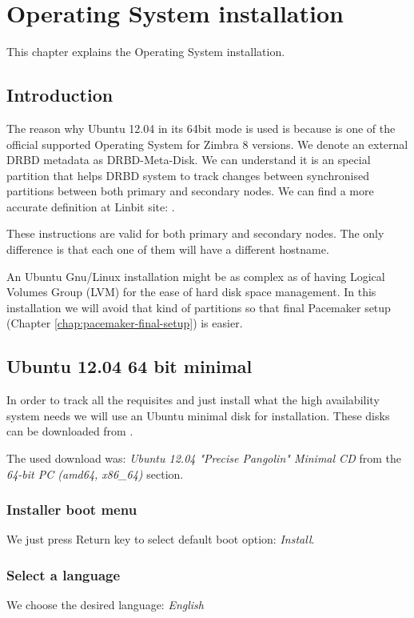 

\chapter{Operating System installation}
\label{chap:operating-system-installation}
This chapter explains the Operating System installation.

\section {Introduction}
The reason why Ubuntu 12.04 in its 64bit mode is used is because is one of the official supported Operating System for Zimbra 8 versions. We denote an external DRBD metadata as DRBD-Meta-Disk. We can understand it is an special partition that helps DRBD system to track changes between synchronised partitions between both primary and secondary nodes. We can find a more accurate definition at Linbit site: \cite{LinbitDRBDInternals}.

These instructions are valid for both primary and secondary nodes. The only difference is that each one of them will have a different hostname.

An Ubuntu Gnu/Linux installation might be as complex as of having Logical Volumes Group (LVM) for the ease of hard disk space management. In this installation we will avoid that kind of partitions so that final Pacemaker setup (Chapter \ref{chap:pacemaker-final-setup}) is easier.

\section {Ubuntu 12.04 64 bit minimal}
In order to track all the requisites and just install what the high availability system needs we will use an Ubuntu minimal disk for installation. These disks can be downloaded from \cite{UbuntuMinimalDisk}.

The used download was: \textit{Ubuntu 12.04 "Precise Pangolin" Minimal CD} from the \textit{64-bit PC (amd64, x86\_64)} section. 

\subsection {Installer boot menu}
We just press Return key to select default boot option: \textit{Install}.
\subsection {Select a language}
We choose the desired language: \textit{English}
